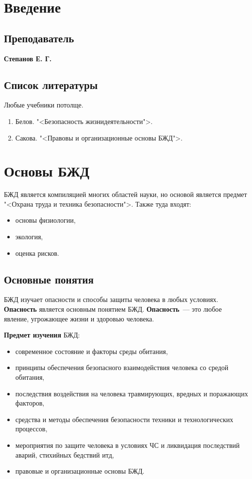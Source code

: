 \section{Введение}
\subsection{Преподаватель}
\textbf{Степанов Е. Г.}

\subsection{Список литературы}
Любые учебники потолще.
\begin{enumerate}
	\item Белов. "<Безопасность жизнидеятельности">.
	\item Сакова. "<Правовы и организационные основы БЖД">.
\end{enumerate}

\section{Основы БЖД}
БЖД является компиляцией многих областей науки, но основой является предмет "<Охрана труда и техника безопасности">. Также туда входят:
\begin{itemize}
	\item основы физиологии,
	\item экология,
	\item оценка рисков.
\end{itemize}

\subsection{Основные понятия}
БЖД изучает опасности и способы защиты человека в любых условиях. \textbf{Опасность} является основным понятием БЖД. \textbf{Опасность}~--- это любое явление, угрожающее жизни и здоровью человека.

\textbf{Предмет изучения} БЖД:
\begin{itemize}
	\item современное состояние и факторы среды обитания,
	\item принципы обеспечения безопасного взаимодействия человека со средой обитания,
	\item последствия воздействия на человека травмирующих, вредных и поражающих факторов,
	\item средства и методы обеспечения безопасности техники и технологических процессов,
	\item мероприятия по защите человека в условиях ЧС и ликвидация последствий аварий, стихийных бедствий итд,
	\item правовые и организационные основы БЖД.
\end{itemize}

